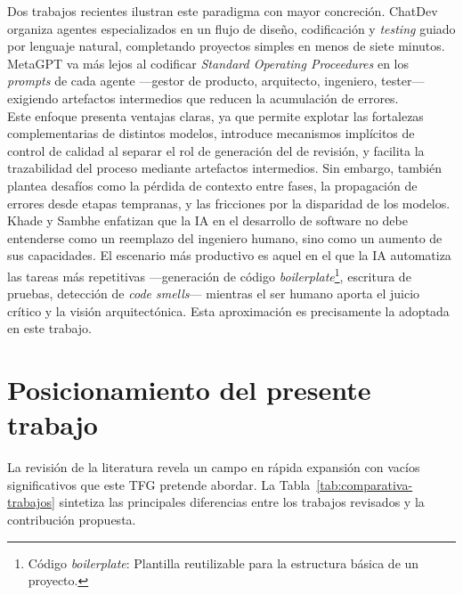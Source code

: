 Dos trabajos recientes ilustran este paradigma con mayor concreción. ChatDev \cite{Qian:2024:ChatDev} organiza agentes especializados en un flujo de diseño, codificación y \textit{testing} guiado por lenguaje natural, completando proyectos simples en menos de siete minutos. MetaGPT \cite{Hong:2024:MetaGPT} va más lejos al codificar \textit{Standard Operating Proceedures} en los \textit{prompts} de cada agente ---gestor de producto, arquitecto, ingeniero, tester--- exigiendo artefactos intermedios que reducen la acumulación de errores.\\

Este enfoque presenta ventajas claras, ya que permite explotar las fortalezas complementarias de distintos modelos, introduce mecanismos implícitos de control de calidad al separar el rol de generación del de revisión, y facilita la trazabilidad del proceso mediante artefactos intermedios. Sin embargo, también plantea desafíos como la pérdida de contexto entre fases, la propagación de errores desde etapas tempranas, y las fricciones por la disparidad de los modelos.\\

Khade y Sambhe \cite{Khade:2025:AIinSD} enfatizan que la \ac{IA} en el desarrollo de software no debe entenderse como un reemplazo del ingeniero humano, sino como un aumento de sus capacidades. El escenario más productivo es aquel en el que la \ac{IA} automatiza las tareas más repetitivas ---generación de código \textit{boilerplate}\footnote{Código \textit{boilerplate}: Plantilla reutilizable para la estructura básica de un proyecto.}, escritura de pruebas, detección de \textit{code smells}--- mientras el ser humano aporta el juicio crítico y la visión arquitectónica. Esta aproximación es precisamente la adoptada en este trabajo.

\section{Posicionamiento del presente trabajo} \label{sec:posicionamiento}

La revisión de la literatura revela un campo en rápida expansión con vacíos significativos que este \ac{TFG} pretende abordar. La Tabla~\ref{tab:comparativa-trabajos} sintetiza las principales diferencias entre los trabajos revisados y la contribución propuesta.

